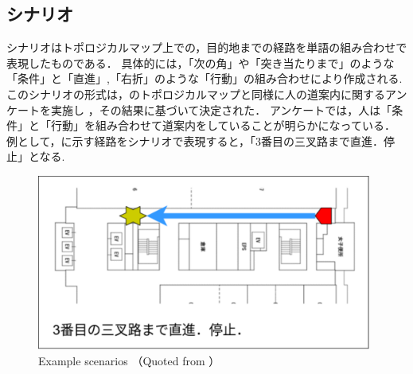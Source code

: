 \subsection{シナリオ}
シナリオはトポロジカルマップ上での，目的地までの経路を単語の組み合わせで表現したものである．
具体的には，「次の角」や「突き当たりまで」のような「条件」と「直進」,「右折」のような「行動」の組み合わせにより作成される.
このシナリオの形式は，のトポロジカルマップと同様に人の道案内に関するアンケートを実施し
，その結果に基づいて決定された．
アンケートでは，人は「条件」と「行動」を組み合わせて道案内をしていることが明らかになっている．
例として，に示す経路をシナリオで表現すると，「3番目の三叉路まで直進．停止」となる.
\vspace{3zh}
\begin{figure}[htbp]
    \centering
     \includegraphics[width=110mm]{images/pdf/scenario/scenario01.pdf}
     \caption{Example scenarios （Quoted from \cite{haruyama2023}）}
     \label{fig:scenario01}
\end{figure}